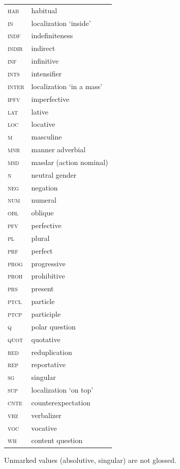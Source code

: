 \documentclass[output=paper,colorlinks=true, citecolor=brown]{langscibook}
\begin{document}
\begin{tabularx}{.45\textwidth}{lQ}
{\scshape hab} & habitual \\
\scshape in & localization ‘inside’ \\
{\scshape indf} & indefiniteness \\
{\scshape indir} & indirect \\
{\scshape inf} & infinitive \\
{\scshape ints} & intensifier \\
{\scshape inter} & localization ‘in a mass’ \\
{\scshape ipfv} & imperfective \\
{\scshape lat} & lative \\
{\scshape loc} & locative \\
{\scshape m} & masculine \\
{\scshape mnr} & manner adverbial \\
{\scshape msd} & masdar (action nominal) \\
{\scshape n} & neutral gender \\
{\scshape neg} & negation \\
{\scshape num} & numeral  \\
{\scshape obl} & oblique   \\
{\scshape pfv} & perfective \\
{\scshape pl} & plural \\
{\scshape prf} & perfect \\
{\scshape prog} & progressive \\
{\scshape proh} & prohibitive  \\
{\scshape prs} & present \\
{\scshape ptcl} & particle \\
{\scshape ptcp} & participle \\
{\scshape q} & polar question \\
{\scshape quot} & quotative \\
{\scshape red} & reduplication \\
{\scshape rep} & reportative \\
{\scshape sg} & singular \\
{\scshape sup} & localization ‘on top’ \\
{\scshape cnte} & counterexpectation \\
{\scshape vbz} & verbalizer \\
{\scshape voc} & vocative \\
{\scshape wh} & content question \\
\end{tabularx}
\medskip

\noindent

Unmarked values (absolutive, singular) are not glossed.


\sloppy\printbibliography[heading=subbibliography,notkeyword=this]
\end{document}
